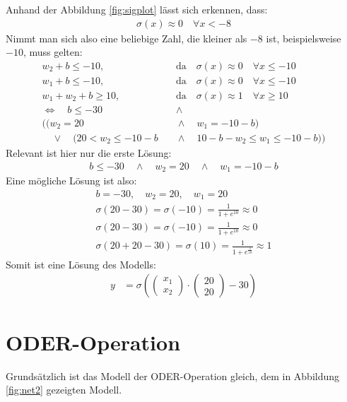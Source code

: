 Anhand der Abbildung \ref{fig:sigplot} lässt sich erkennen, dass:
\begin{align}
    \sigma(x)\approx0\quad \forall x< -8
\end{align}
Nimmt man sich also eine beliebige Zahl, die kleiner als $-8$ ist, beispielsweise $-10$, muss gelten:
\begin{align}
    w_2+b\leq-10,&\quad\text{da}\quad\sigma(x)\approx 0\quad\forall x\leq -10 \\
    w_1+b\leq-10,&\quad\text{da}\quad\sigma(x)\approx 0\quad\forall x\leq -10 \\
    w_1+w_2+b\geq10,&\quad\text{da}\quad\sigma(x)\approx 1\quad\forall x\geq 10 \\
    \Leftrightarrow\quad b\leq-30 &\quad\land\quad \\
    ((w_2=20 &\quad\land\quad w_1=-10-b) \\
    \quad\lor\quad (20<w_2\leq-10-b &\quad\land\quad 10-b-w_2\leq w_1 \leq -10-b))
\end{align}
Relevant ist hier nur die erste Lösung:
\begin{align}
    b\leq-30 \quad\land\quad w_2=20 \quad\land\quad w_1=-10-b
\end{align}
Eine mögliche Lösung ist also:
\begin{align}
    b=-30,\quad w_2=20,\quad w_1=20 \\
    \sigma(20-30)=\sigma(-10)=\frac{1}{1+e^{10}}\approx 0 \\
    \sigma(20-30)=\sigma(-10)=\frac{1}{1+e^{10}}\approx 0 \\
    \sigma(20+20-30)=\sigma(10)=\frac{1}{1+e^{\frac{1}{10}}}\approx 1
\end{align}
Somit ist eine Lösung des Modells:
\begin{align}
    y&=\sigma\left(\begin{pmatrix}
        x_1 \\
        x_2
    \end{pmatrix}\cdot
    \begin{pmatrix}
        20 \\
        20
    \end{pmatrix}-30\right)
\end{align}

\section{ODER-Operation}
Grundsätzlich ist das Modell der ODER-Operation gleich, dem in Abbildung \ref{fig:net2} gezeigten Modell.

